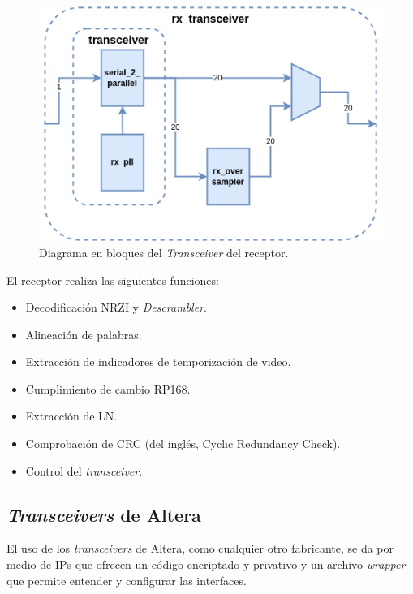   \begin{figure}[htbp]
      \centering
      \includegraphics[width=\linewidth]{./Figures/rx_xcvr.png}
      \caption{Diagrama en bloques del \textit{Transceiver} del receptor.}\label{fig:rx_xcvr}
  \end{figure}

  El receptor realiza las siguientes funciones:
  \begin{itemize}
      \item Decodificación NRZI y \textit{Descrambler}.
      \item Alineación de palabras.
      \item Extracción de indicadores de temporización de video.
      \item Cumplimiento de cambio RP168.
      \item Extracción de LN\@.
      \item Comprobación de CRC  (del inglés, Cyclic Redundancy Check)\@.
      \item Control del \textit{transceiver}.
  \end{itemize}

\subsection{\textit{Transceivers} de Altera}

  El uso de los \textit{transceivers} de Altera, como cualquier otro fabricante,
  se da por medio de IPs que ofrecen un código encriptado y privativo y un
  archivo \textit{wrapper} que permite entender y configurar las interfaces.

